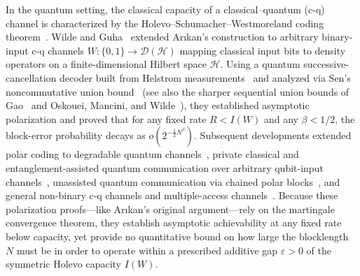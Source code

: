 \documentclass[10pt,a4paper]{article}
\numberwithin{equation}{section}
\theoremstyle{plain}
\theoremstyle{definition}
\theoremstyle{remark}
\newcommand{\cH}{\mathcal{H}}
\newcommand{\cD}{\mathcal{D}}
\begin{document}
In the quantum setting, the classical capacity of a classical--quantum (c-q) channel is characterized by the Holevo--Schumacher--Westmoreland coding theorem~\cite{Holevo1998,SchumacherWestmoreland1997}. Wilde and Guha~\cite{WildeGuha2013} extended Ar{\i}kan's construction to arbitrary binary-input c-q channels $W : \{0,1\} \to \cD(\cH)$ mapping classical input bits to density operators on a finite-dimensional Hilbert space $\cH$. Using a quantum successive-cancellation decoder built from Helstrom measurements~\cite{Helstrom1976} and analyzed via Sen's noncommutative union bound~\cite{Sen2012} (see also the sharper sequential union bounds of Gao~\cite{Gao2015} and Oskouei, Mancini, and Wilde~\cite{OskoueiManciniWilde2019}), they established asymptotic polarization and proved that for any fixed rate $R < I(W)$ and any $\beta < 1/2$, the block-error probability decays as $o(2^{-\frac{1}{2} N^{\beta}})$. Subsequent developments extended polar coding to degradable quantum channels~\cite{WildeGuha2013Degradable}, private classical and entanglement-assisted quantum communication over arbitrary qubit-input channels~\cite{RenesDupuisRenner2012,RenesWilde2014}, unassisted quantum communication via chained polar blocks~\cite{RenesSutterDupuisRenner2015}, and general non-binary c-q channels and multiple-access channels~\cite{NasserRenes2018}. Because these polarization proofs—like Ar{\i}kan's original argument—rely on the martingale convergence theorem, they establish asymptotic achievability at any fixed rate below capacity, yet provide no quantitative bound on how large the blocklength $N$ must be in order to operate within a prescribed additive gap $\varepsilon > 0$ of the symmetric Holevo capacity $I(W)$.
\end{document}
